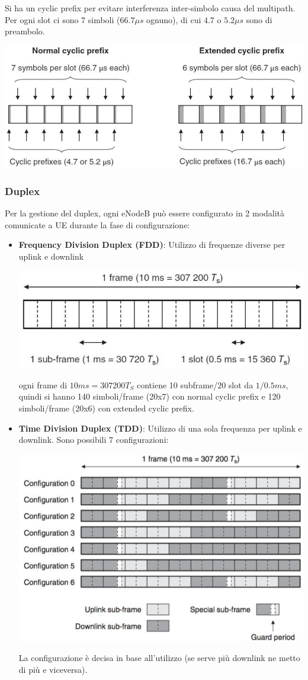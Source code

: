 Si ha un cyclic prefix per evitare interferenza inter-simbolo causa del multipath. Per ogni slot ci sono 7 simboli ($66.7 \mu s$ ognuno), di cui $4.7$ o $5.2 \mu s$ sono di preambolo.
\begin{center}
	\includegraphics[width=0.7\linewidth]{img/mobile/cycprefix}
\end{center}

\subsubsection{Duplex}

Per la gestione del duplex, ogni eNodeB può essere configurato in 2 modalità comunicate a UE durante la fase di configurazione: 
\begin{itemize}
	\item \textbf{Frequency Division Duplex (FDD)}: Utilizzo di frequenze diverse per uplink e downlink
	\begin{center}
		\includegraphics[width=0.5\linewidth]{img/mobile/fdd}
	\end{center}
	ogni frame di $10ms = 307200 T_S$ contiene 10 subframe/20 slot da $1/0.5ms$, quindi si hanno 140 simboli/frame (20x7) con normal cyclic prefix e 120 simboli/frame (20x6) con extended cyclic prefix.\\
	
	\newpage
	
	\item \textbf{Time Division Duplex (TDD)}: Utilizzo di una sola frequenza per uplink e downlink. Sono possibili 7 configurazioni:
	\begin{center}
		\includegraphics[width=0.7\linewidth]{img/mobile/tdd}
	\end{center}
	La configurazione è decisa in base all'utilizzo (se serve più downlink ne metto di più e viceversa).
\end{itemize}

